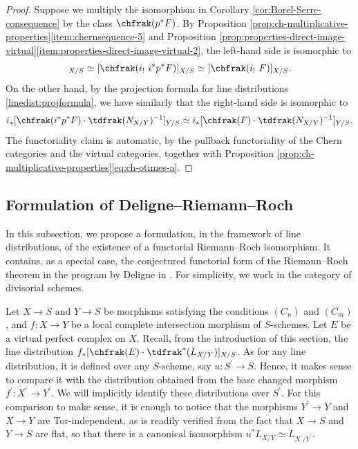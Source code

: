 \begin{proof}
Suppose we multiply the isomorphism in Corollary \ref{cor:Borel-Serre-consequence} by the class $\chfrak(p^\ast F)$. By Proposition \ref{prop:ch-multiplicative-properties}\eqref{item:chernsequence-5} and Proposition \ref{prop:properties-direct-image-virtual}\eqref{item:properties-direct-image-virtual-2}, the left-hand side is isomorphic to\vspace*{-3pt}
\begin{displaymath}
[\chfrak(p^\ast F \otimes i_!\ \Ocal_X)]_{X/S} \simeq [\chfrak(i_!\ i^\ast p^\ast F)]_{X/S} \simeq [\chfrak(i_!\ F)]_{X/S}.
\end{displaymath}
On the other hand, by the projection formula for line distributions \eqref{linedist:projformula}, we have similarly that the right-hand side is isomorphic to\vspace*{-3pt}
\begin{displaymath}
i_\ast [\chfrak(i^\ast p^\ast F) \cdot \tdfrak(N_{X/Y})^{-1}]_{Y/S} \simeq i_\ast [\chfrak(F) \cdot \tdfrak(N_{X/Y})^{-1}]_{Y/S}.
\end{displaymath}
The functoriality claim is automatic, by the pullback functoriality of the Chern categories and the virtual categories, together with Proposition \ref{prop:ch-multiplicative-properties}\eqref{eq:ch-otimes-a}.
\end{proof}
\subsection{Formulation of Deligne--Riemann--Roch}\label{subsec:FormDRR}
In this subsection, we propose a formulation, in the framework of line distributions, of the existence of a functorial Riemann--Roch isomorphism. It contains, as a special case, the conjectured functorial form of the Riemann--Roch theorem in the program by Deligne in \cite{Deligne-determinant}. For simplicity, we work in the category of divisorial schemes.

Let $X\to S$ and $Y\to S$ be morphisms satisfying the conditions $(C_{n})$ and $(C_{m})$, and $f\colon X\to Y$ be a local complete intersection morphism of $S$-schemes. Let $E$ be a virtual perfect complex on $X$. Recall, from the introduction of this section, the line distribution $f_{\ast}[\chfrak(E)\cdot\tdfrak^{\ast}(L_{X/Y})]_{X/S}$. As for any line distribution, it is defined over any $S$-scheme, say $u: S^{\prime}\to S$. Hence, it makes sense to compare it with the distribution obtained from the base changed morphism $f^{\prime}: X^{\prime} \to Y^{\prime}$. We will implicitly identify these distributions over $S^{\prime}$. For this comparison to make sense, it is enough to notice that the morphisms $Y^{\prime} \to Y$ and $X \to Y$ are Tor-independent, as is readily verified from the fact that $X \to S$ and $Y \to S$ are flat, so that there is a canonical isomorphism $u^{\ast} L_{X/Y} \simeq L_{X^{\prime}/Y^{\prime} }$.


